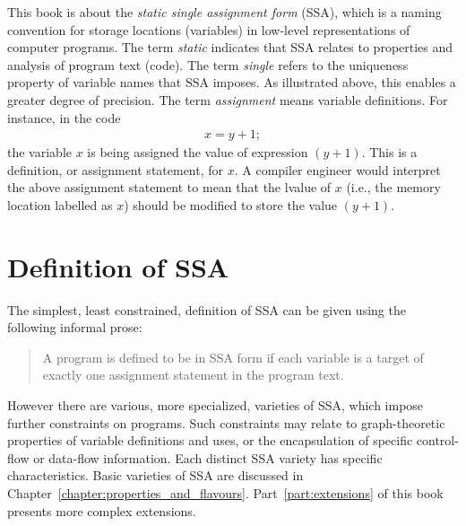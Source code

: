 This book is about the \textit{static single assignment form} (SSA),
which is a naming convention for storage locations (variables)
in low-level representations
of computer programs.
The term \textit{static} indicates that SSA relates to properties
and analysis of program text (code).
The term \textit{single} refers to the uniqueness property of
variable names that SSA imposes. As illustrated above, this enables
a greater degree of precision.
The term \textit{assignment} means variable definitions. For
instance, in the code
\begin{equation*}
\begin{array}{l}
x = y+1;
\end{array}
\end{equation*}
the variable $x$ is being assigned the value of expression $(y+1)$.
This is a definition, or assignment statement, for $x$.
A compiler engineer would interpret the above assignment statement
to mean that the lvalue of
$x$ (i.e., the memory location labelled as $x$) should be modified to store
the value $(y+1)$.


\section{Definition of SSA}


The simplest, 
least constrained, definition of SSA can be given using the following informal prose:

\begin{quote}
A program is defined to be in SSA
form if each variable is a target of
exactly one assignment statement in the
program text.
\end{quote}



However
there are various, more specialized, varieties of SSA,
which impose further constraints on programs.
Such constraints may relate to %
graph-theoretic properties of variable definitions and uses, or
the encapsulation of specific control-flow or data-flow information.
Each distinct SSA variety has specific characteristics. Basic
varieties
of SSA are discussed in
Chapter~\ref{chapter:properties_and_flavours}.
Part~\ref{part:extensions}
of this book presents more complex extensions.

